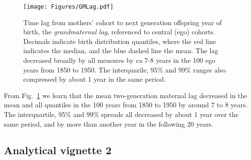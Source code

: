 \documentclass{article}
\begin{document}
\begin{figure}
\texttt{[image: Figures/GMLag.pdf]}
\caption{Time lag from mothers' cohort to next generation offspring year of birth, the \emph{grandmaternal lag}, referenced to central (ego) cohorts. Decimals indicate birth distribution quantiles, where the red line indicates the median, and the blue dashed line the mean. The lag decreased broadly by all measures by ca 7-8 years in the 100 ego years from 1850 to 1950. The interquarile, 95\% and 99\% ranges also compressed by about 1 year in the same period.}
\label{fig:gmlag}
\end{figure}

From Fig.~\ref{fig:gmlag} we learn that the mean two-generation maternal lag decreased in the mean and all quantiles in the 100 years from 1850 to 1950 by around 7 to 8 years. The interquartile, 95\% and 99\% spreads all decreased by about 1 year over the same period, and by more than another year in the following 20 years.

\subsection{Analytical vignette 2}
\end{document}
